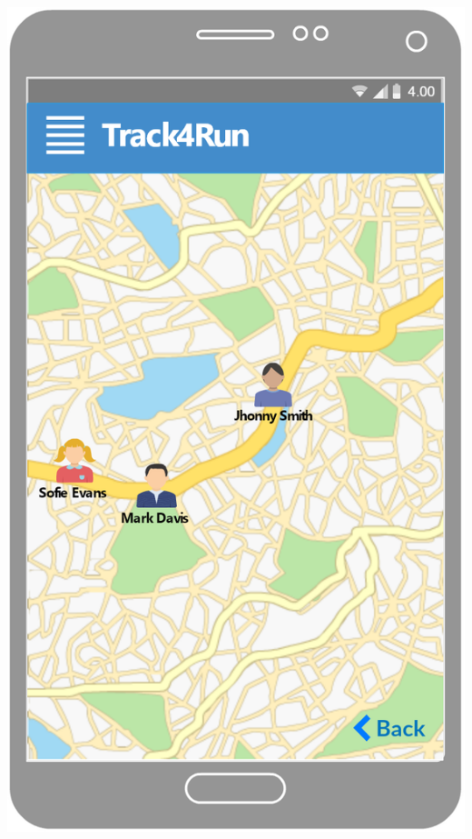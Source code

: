 \begin{center}
\begin{minipage}[c]{.40\textwidth}
\includegraphics[width=1\textwidth]{Images/userInterface/Race}
\end{minipage}
\end{center}
